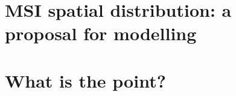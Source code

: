\documentclass[aspectratio=169]{beamer}
\begin{document}

%
%
\section{MSI spatial distribution: a proposal for modelling}
%
%
\section{What is the point?}
%

%
%
\end{document}
